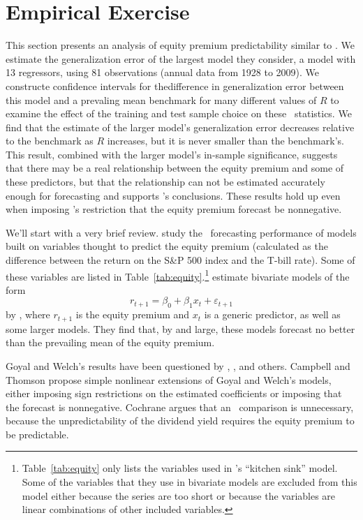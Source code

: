 \documentclass[11pt]{article}
\newcommand{\citepos}[1]{\citeauthor{#1}'s \citeyearpar{#1}}
\begin{document}
\section{Empirical Exercise}\label{sec:empirics}
This section presents an analysis of equity premium predictability
similar to \citet{goyal-welch-2008-rfs}.  We estimate the
generalization error of the largest model they consider, a model with
13 regressors, using 81 observations (annual data from 1928 to 2009).
We constructe confidence intervals for thedifference in generalization
error between this model and a prevaling mean benchmark for many
different values of $R$ to examine the effect of the training and test
sample choice on these \oos\ statistics.  We find that the estimate of
the larger model's generalization error decreases relative to the
benchmark as $R$ increases, but it is never smaller than the
benchmark's.  This result, combined with the larger model's in-sample
significance, suggests that there may be a real relationship between
the equity premium and some of these predictors, but that the
relationship can not be estimated accurately enough for forecasting
and supports \citepos{goyal-welch-2008-rfs} conclusions.  These
results hold up even when imposing
\citepos{campbell-thompson-2008-rfs} restriction that the equity
premium forecast be nonnegative.

We'll start with a very brief review.  \citet{goyal-welch-2008-rfs}
study the \oos\ forecasting performance of models built on variables
thought to predict the equity premium (calculated as the difference
between the return on the S\&P 500 index and the T-bill rate).  Some
of these variables are listed in
Table~\ref{tab:equity}.\footnote{Table~\ref{tab:equity} only lists the
  variables used in \citepos{goyal-welch-2008-rfs} ``kitchen sink''
  model.  Some of the variables that they use in bivariate models are
  excluded from this model either because the series are too short or
  because the variables are linear combinations of other included
  variables.}  \citet{goyal-welch-2008-rfs} estimate bivariate models
of the form
\[
r_{t+1} = \beta_0 + \beta_1 x_t + \varepsilon_{t+1}
\]
by \ols, where $r_{t+1}$ is the equity premium and $x_t$ is a generic
predictor, as well as some larger models.  They find that, by and
large, these models forecast no better than the prevailing mean of the
equity premium.

Goyal and Welch's results have been questioned by
\citet{campbell-thompson-2008-rfs}, \citet{cochrane-2008-rfs}, and
others.  Campbell and Thomson propose simple nonlinear extensions of
Goyal and Welch's models, either imposing sign restrictions on the
estimated coefficients or imposing that the forecast is nonnegative.
Cochrane argues that an \oos\ comparison is unnecessary, because the
unpredictability of the dividend yield requires the equity premium to
be predictable.
\end{document}
